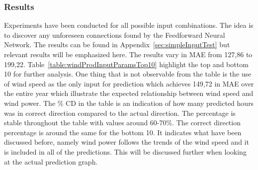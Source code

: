 \subsubsection{Results}
\label{sec:predictionBasicInputParams}
Experiments have been conducted for all possible input combinations. The idea is to discover any unforeseen connections found by the Feedforward Neural Network. The results can be found in Appendix~\ref{sec:simpleInputTest} but relevant results will be emphasized here. The results vary in MAE from 127,86 to 199,22. Table~\ref{table:windProdInputParamsTop10} highlight the top and bottom 10 for further analysis. One thing that is not observable from the table is the use of wind speed as the only input for prediction which achieves 149,72 in MAE over the entire year which illustrate the expected relationship between wind speed and wind power. The \% CD in the table is an indication of how many predicted hours was in correct direction compared to the actual direction. The percentage is stable throughout the table with values around 60-70\%. The correct direction percentage is around the same for the bottom 10. It indicates what have been discussed before, namely wind power follows the trends of the wind speed and it is included in all of the predictions. This will be discussed further when looking at the actual prediction graph.

